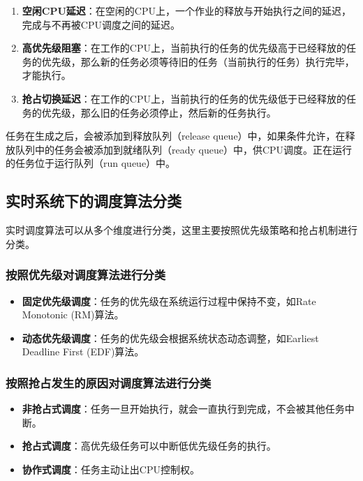 \begin{enumerate}
    \item \textbf{空闲CPU延迟}：在空闲的CPU上，一个作业的释放与开始执行之间的延迟，完成与不再被CPU调度之间的延迟。
    
    \item \textbf{高优先级阻塞}：在工作的CPU上，当前执行的任务的优先级高于已经释放的任务的优先级，那么新的任务必须等待旧的任务（当前执行的任务）执行完毕，才能执行。
    
    \item \textbf{抢占切换延迟}：在工作的CPU上，当前执行的任务的优先级低于已经释放的任务的优先级，那么旧的任务必须停止，然后新的任务执行。
\end{enumerate}

任务在生成之后，会被添加到释放队列（release queue）中，如果条件允许，在释放队列中的任务会被添加到就绪队列（ready queue）中，供CPU调度。正在运行的任务位于运行队列（run queue）中。

\subsection{实时系统下的调度算法分类}

实时调度算法可以从多个维度进行分类，这里主要按照优先级策略和抢占机制进行分类。


\subsubsection{按照优先级对调度算法进行分类}

\begin{itemize}
    \item \textbf{固定优先级调度}：任务的优先级在系统运行过程中保持不变，如Rate Monotonic (RM)算法。
    \item \textbf{动态优先级调度}：任务的优先级会根据系统状态动态调整，如Earliest Deadline First (EDF)算法。
\end{itemize}

\subsubsection{按照抢占发生的原因对调度算法进行分类}

\begin{itemize}
    \item \textbf{非抢占式调度}：任务一旦开始执行，就会一直执行到完成，不会被其他任务中断。
    \item \textbf{抢占式调度}：高优先级任务可以中断低优先级任务的执行。
    \item \textbf{协作式调度}：任务主动让出CPU控制权。
\end{itemize}

